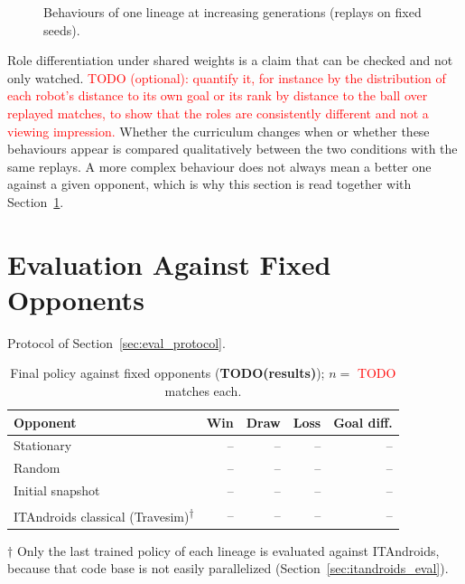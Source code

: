 \begin{figure}[ht]
    \centering
    \caption{Behaviours of one lineage at increasing generations (replays on fixed seeds).}
    \label{fig:behaviour}
\end{figure}

Role differentiation under shared weights is a claim that can be checked and not only watched.  \textcolor{red}{TODO (optional): quantify it, for instance by the distribution of each robot's distance to its own goal or its rank by distance to the ball over replayed matches, to show that the roles are consistently different and not a viewing impression.}
Whether the curriculum changes when or whether these behaviours appear is compared qualitatively between the two conditions with the same replays.  A more complex behaviour does not always mean a better one against a given opponent, which is why this section is read together with Section~\ref{sec:fixed_eval}.

\section{Evaluation Against Fixed Opponents}
\label{sec:fixed_eval}

Protocol of Section~\ref{sec:eval_protocol}.

\begin{table}[ht]
    \centering
    \caption{Final policy against fixed opponents (\textbf{TODO(results)}); $n=$ \textcolor{red}{TODO} matches each.}
    \label{tab:fixed_eval}
    \small
    \begin{tabular}{lrrrr}
        \toprule
        \textbf{Opponent} & \textbf{Win} & \textbf{Draw} & \textbf{Loss} & \textbf{Goal diff.} \\
        \midrule
        Stationary             & -- & -- & -- & -- \\
        Random                 & -- & -- & -- & -- \\
        Initial snapshot       & -- & -- & -- & -- \\
        ITAndroids classical (Travesim)\textsuperscript{$\dagger$} & -- & -- & -- & -- \\
        \bottomrule
    \end{tabular}

    \smallskip
    {\footnotesize $\dagger$ Only the last trained policy of each lineage is evaluated against ITAndroids, because that code base is not easily parallelized (Section~\ref{sec:itandroids_eval}).}
\end{table}

